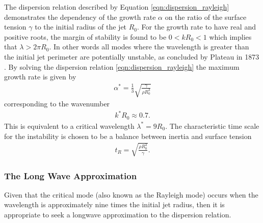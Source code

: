 \documentclass[11pt]{article}
\begin{document}
The dispersion relation described by Equation \ref{eqn:dispersion_rayleigh} demonstrates the dependency of the growth rate $\alpha$ on the ratio of the surface tension $\gamma$ to the initial radius of the jet $R_0$. For the growth rate to have real and positive roots, the margin of stability is found to be $0 < kR_0 <1$ which implies that $\lambda > 2 \pi R_0$. In other words all modes where the wavelength is greater than the initial jet perimeter are potentially unstable, as concluded by Plateau in 1873 \cite{plateau1873statique}. By solving the dispersion relation \ref{eqn:dispersion_rayleigh} the maximum growth rate is given by 
\begin{align*}
\alpha^* = \frac{1}{3} \sqrt{\frac{\gamma}{\rho R_0^3}}
\end{align*}
corresponding to the wavenumber
\begin{align*}
k^*R_0 \approx 0.7.
\end{align*}
This is equivalent to a critical wavelength $\lambda^* = 9 R_0$. The characteristic time scale for the instability is chosen to be a balance between inertia and surface tension
\begin{align*}
t_R = \sqrt{\frac{\rho R_0^3}{\gamma}}.
\end{align*}

\subsubsection{The Long Wave Approximation}
Given that the critical mode (also known as the Rayleigh mode) occurs when the wavelength is approximately nine times the initial jet radius, then it is appropriate to seek a longwave approximation to the dispersion relation.
\end{document}
